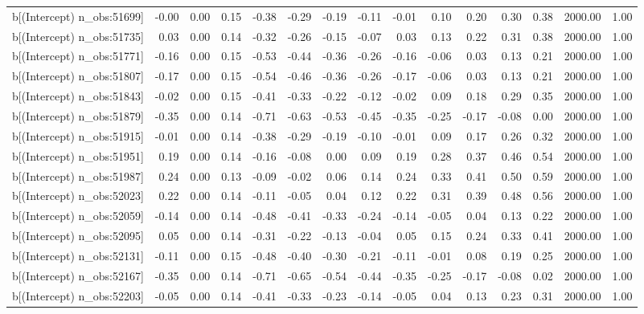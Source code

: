 \begin{table}[ht]
\begin{tabular}{rrrrrrrrrrrrrrr}
  b[(Intercept) n\_obs:51699] & -0.00 & 0.00 & 0.15 & -0.38 & -0.29 & -0.19 & -0.11 & -0.01 & 0.10 & 0.20 & 0.30 & 0.38 & 2000.00 & 1.00 \\ 
  b[(Intercept) n\_obs:51735] & 0.03 & 0.00 & 0.14 & -0.32 & -0.26 & -0.15 & -0.07 & 0.03 & 0.13 & 0.22 & 0.31 & 0.38 & 2000.00 & 1.00 \\ 
  b[(Intercept) n\_obs:51771] & -0.16 & 0.00 & 0.15 & -0.53 & -0.44 & -0.36 & -0.26 & -0.16 & -0.06 & 0.03 & 0.13 & 0.21 & 2000.00 & 1.00 \\ 
  b[(Intercept) n\_obs:51807] & -0.17 & 0.00 & 0.15 & -0.54 & -0.46 & -0.36 & -0.26 & -0.17 & -0.06 & 0.03 & 0.13 & 0.21 & 2000.00 & 1.00 \\ 
  b[(Intercept) n\_obs:51843] & -0.02 & 0.00 & 0.15 & -0.41 & -0.33 & -0.22 & -0.12 & -0.02 & 0.09 & 0.18 & 0.29 & 0.35 & 2000.00 & 1.00 \\ 
  b[(Intercept) n\_obs:51879] & -0.35 & 0.00 & 0.14 & -0.71 & -0.63 & -0.53 & -0.45 & -0.35 & -0.25 & -0.17 & -0.08 & 0.00 & 2000.00 & 1.00 \\ 
  b[(Intercept) n\_obs:51915] & -0.01 & 0.00 & 0.14 & -0.38 & -0.29 & -0.19 & -0.10 & -0.01 & 0.09 & 0.17 & 0.26 & 0.32 & 2000.00 & 1.00 \\ 
  b[(Intercept) n\_obs:51951] & 0.19 & 0.00 & 0.14 & -0.16 & -0.08 & 0.00 & 0.09 & 0.19 & 0.28 & 0.37 & 0.46 & 0.54 & 2000.00 & 1.00 \\ 
  b[(Intercept) n\_obs:51987] & 0.24 & 0.00 & 0.13 & -0.09 & -0.02 & 0.06 & 0.14 & 0.24 & 0.33 & 0.41 & 0.50 & 0.59 & 2000.00 & 1.00 \\ 
  b[(Intercept) n\_obs:52023] & 0.22 & 0.00 & 0.14 & -0.11 & -0.05 & 0.04 & 0.12 & 0.22 & 0.31 & 0.39 & 0.48 & 0.56 & 2000.00 & 1.00 \\ 
  b[(Intercept) n\_obs:52059] & -0.14 & 0.00 & 0.14 & -0.48 & -0.41 & -0.33 & -0.24 & -0.14 & -0.05 & 0.04 & 0.13 & 0.22 & 2000.00 & 1.00 \\ 
  b[(Intercept) n\_obs:52095] & 0.05 & 0.00 & 0.14 & -0.31 & -0.22 & -0.13 & -0.04 & 0.05 & 0.15 & 0.24 & 0.33 & 0.41 & 2000.00 & 1.00 \\ 
  b[(Intercept) n\_obs:52131] & -0.11 & 0.00 & 0.15 & -0.48 & -0.40 & -0.30 & -0.21 & -0.11 & -0.01 & 0.08 & 0.19 & 0.25 & 2000.00 & 1.00 \\ 
  b[(Intercept) n\_obs:52167] & -0.35 & 0.00 & 0.14 & -0.71 & -0.65 & -0.54 & -0.44 & -0.35 & -0.25 & -0.17 & -0.08 & 0.02 & 2000.00 & 1.00 \\ 
  b[(Intercept) n\_obs:52203] & -0.05 & 0.00 & 0.14 & -0.41 & -0.33 & -0.23 & -0.14 & -0.05 & 0.04 & 0.13 & 0.23 & 0.31 & 2000.00 & 1.00 \\ 

\end{tabular}
\end{table}
